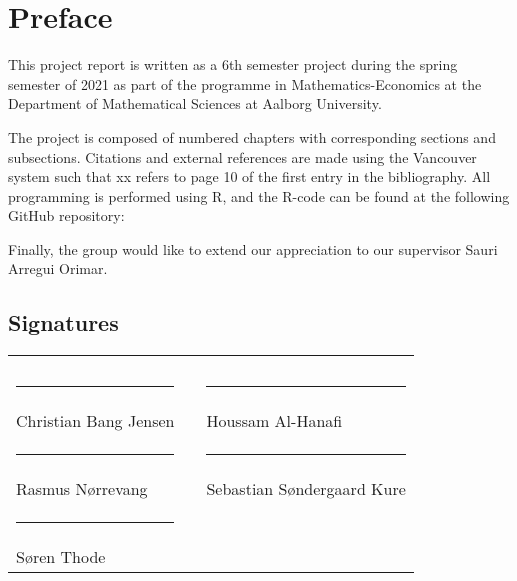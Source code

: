 \section*{Preface}


This project report is written as a 6th semester project during the spring semester of 2021 as part of the programme in Mathematics-Economics at the Department of Mathematical Sciences at Aalborg University. 



The project is composed of numbered chapters with corresponding sections and subsections. Citations and external references are made using the Vancouver system such that xx refers to page 10 of the first entry in the bibliography. All programming is performed using R, and the R-code can be found  at the following GitHub repository: 


Finally, the group would like to extend our appreciation to our supervisor Sauri Arregui Orimar. 
\bigskip
\subsection*{Signatures}
\begin{tabular}{lcl}
    & &\\
    & &\\
    \rule{7cm}{1pt} & \hspace{0.5cm} & \rule{7cm}{1pt} \\
    \vspace{1.5cm}
    Christian Bang Jensen & & Houssam Al-Hanafi \\
    \rule{7cm}{1pt} & \hspace{0.5cm} & \rule{7cm}{1pt} \\
    \vspace{1.5cm}
    Rasmus Nørrevang & & Sebastian Søndergaard Kure\\
    \rule{7cm}{1pt} & \hspace{0.5cm} & \\
    \vspace{1.5cm}
    Søren Thode 
\end{tabular}
\vspace{1cm}
